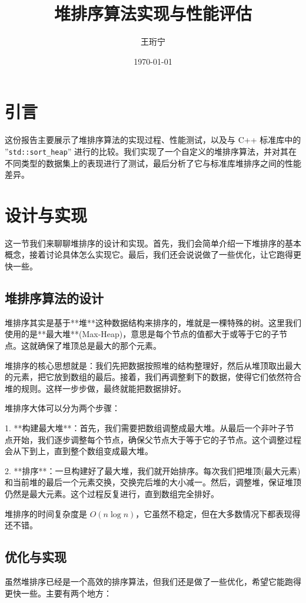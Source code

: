 \documentclass{article}
\title{堆排序算法实现与性能评估}
\author{王珩宁}
\date{\today}
\begin{document}
\maketitle

\section{引言}
这份报告主要展示了堆排序算法的实现过程、性能测试，以及与 C++ 标准库中的 ''\texttt{std::sort\_heap}'' 进行的比较。我们实现了一个自定义的堆排序算法，并对其在不同类型的数据集上的表现进行了测试，最后分析了它与标准库堆排序之间的性能差异。

\section{设计与实现}
这一节我们来聊聊堆排序的设计和实现。首先，我们会简单介绍一下堆排序的基本概念，接着讨论具体怎么实现它。最后，我们还会说说做了一些优化，让它跑得更快一些。

\subsection{堆排序算法的设计}
堆排序其实是基于**堆**这种数据结构来排序的，堆就是一棵特殊的树。这里我们使用的是**最大堆**(Max-Heap)，意思是每个节点的值都大于或等于它的子节点。这就确保了堆顶总是最大的那个元素。

堆排序的核心思想就是：我们先把数据按照堆的结构整理好，然后从堆顶取出最大的元素，把它放到数组的最后。接着，我们再调整剩下的数据，使得它们依然符合堆的规则。这样一步步做，最终就能把数据排好。

堆排序大体可以分为两个步骤：

1. **构建最大堆**：首先，我们需要把数组调整成最大堆。从最后一个非叶子节点开始，我们逐步调整每个节点，确保父节点大于等于它的子节点。这个调整过程会从下到上，直到整个数组变成最大堆。
   
2. **排序**：一旦构建好了最大堆，我们就开始排序。每次我们把堆顶(最大元素)和当前堆的最后一个元素交换，交换完后堆的大小减一。然后，调整堆，保证堆顶仍然是最大元素。这个过程反复进行，直到数组完全排好。

堆排序的时间复杂度是 $O(n \log n)$，它虽然不稳定，但在大多数情况下都表现得还不错。

\subsection{优化与实现}
虽然堆排序已经是一个高效的排序算法，但我们还是做了一些优化，希望它能跑得更快一些。主要有两个地方：
\end{document}
